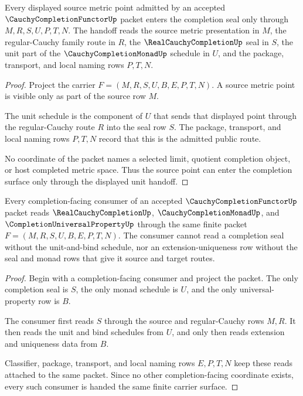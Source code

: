 \begin{theorem}
\label{thm:cauchycompletionfunctor-source-metric-unit-handoff}
Every displayed source metric point admitted by an accepted $\CauchyCompletionFunctorUp$ packet enters the completion seal only through $M,R,S,U,P,T,N$. The handoff reads the source metric presentation in $M$, the regular-Cauchy family route in $R$, the $\RealCauchyCompletionUp$ seal in $S$, the unit part of the $\CauchyCompletionMonadUp$ schedule in $U$, and the package, transport, and local naming rows $P,T,N$.
\end{theorem}
\begin{proof}
Project the carrier $F=(M,R,S,U,B,E,P,T,N)$. A source metric point is visible only as part of the source row $M$.

The unit schedule is the component of $U$ that sends that displayed point through the regular-Cauchy route $R$ into the seal row $S$. The package, transport, and local naming rows $P,T,N$ record that this is the admitted public route.

No coordinate of the packet names a selected limit, quotient completion object, or host completed metric space. Thus the source point can enter the completion surface only through the displayed unit handoff.
\end{proof}

\begin{theorem}
\label{thm:cauchycompletionfunctor-completion-consumer-handoff}
Every completion-facing consumer of an accepted $\CauchyCompletionFunctorUp$ packet reads $\RealCauchyCompletionUp$, $\CauchyCompletionMonadUp$, and $\CompletionUniversalPropertyUp$ through the same finite packet $F=(M,R,S,U,B,E,P,T,N)$. The consumer cannot read a completion seal without the unit-and-bind schedule, nor an extension-uniqueness row without the seal and monad rows that give it source and target routes.
\end{theorem}
\begin{proof}
Begin with a completion-facing consumer and project the packet. The only completion seal is $S$, the only monad schedule is $U$, and the only universal-property row is $B$.

The consumer first reads $S$ through the source and regular-Cauchy rows $M,R$. It then reads the unit and bind schedules from $U$, and only then reads extension and uniqueness data from $B$.

Classifier, package, transport, and local naming rows $E,P,T,N$ keep these reads attached to the same packet. Since no other completion-facing coordinate exists, every such consumer is handed the same finite carrier surface.
\end{proof}


